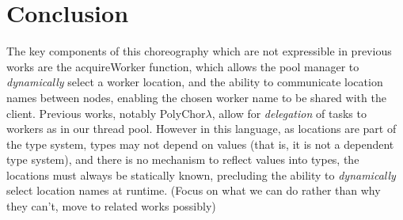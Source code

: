 \section{Conclusion}
\label{sec:conclusion}

The key components of this choreography which are not expressible in previous works are the \textsf{acquireWorker} function, which allows the pool manager to \emph{dynamically} select a worker location, and the ability to communicate location names between nodes, enabling the chosen worker name to be shared with the client.
Previous works, notably PolyChor$\lambda$, allow for \emph{delegation} of tasks to workers as in our thread pool.
However in this language, as locations are part of the type system, types may not depend on values (that is, it is not a dependent type system), and there is no mechanism to reflect values into types, the locations must always be statically known, precluding the ability to \emph{dynamically} select location names at runtime.
(Focus on what we can do rather than why they can't, move to related works possibly)

